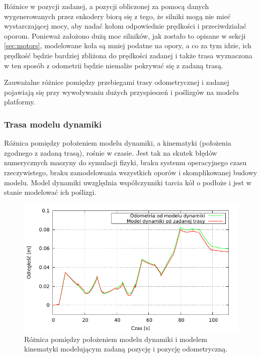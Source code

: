 			Różnice w pozycji zadanej, a pozycji obliczonej za pomocą danych wygenerowanych przez enkodery biorą się z tego, że
			silniki mogą nie mieć wystarczającej mocy, aby nadać kołom odpowiednie prędkości i przeciwdziałać oporom.
			Ponieważ założono dużą moc silników, jak zostało to opisane w sekcji \ref{sec:motors}, modelowane koła są mniej podatne na opory, a co za tym idzie, 
			ich prędkość będzie bardziej zbliżona do prędkości zadanej i także trasa wyznaczona w ten sposób z odometrii będzie niemalże pokrywać się z zadaną trasą.
			
			Zauważalne różnice pomiędzy przebiegami trasy odometrycznej i zadanej pojawiają się przy wywoływaniu dużych przyspieszeń i poślizgów na modelu platformy.
			
		\subsubsection{Trasa modelu dynamiki}
			Różnica pomiędzy położeniem modelu dynamiki, a kinematyki (położenia zgodnego z zadaną trasą), rośnie w czasie.
			Jest tak na skutek błędów numerycznych maszyny do symulacji fizyki, braku systemu operacyjnego czasu rzeczywistego, braku zamodelowania wszystkich oporów i skomplikowanej budowy modelu.
			Model dynamiki uwzględnia współczynniki tarcia kół o podłoże i jest w stanie modelować ich poślizgi.
			
			\begin{figure}[h]
				\centering
				\includegraphics[width=\textwidth]{plots/comparison_dt.pdf}
					\caption{Różnica pomiędzy położeniem modelu dynamiki i modelem kinematyki modelującym zadaną pozycję i pozycję odometryczną.}
				\label{plot:comparison_dt}
			\end{figure}
			
